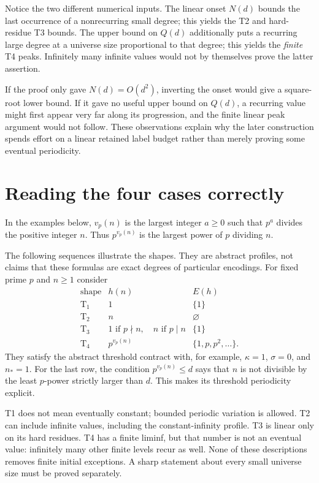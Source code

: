 Notice the two different numerical inputs. The linear onset $N(d)$
bounds the last occurrence of a nonrecurring small degree; this yields
the T2 and hard-residue T3 bounds. The upper bound on $Q(d)$ additionally
puts a recurring large degree at a universe size proportional to that degree;
this yields the \emph{finite} T4 peaks. Infinitely many infinite values
would not by themselves prove the latter assertion.

If the proof only gave $N(d)=O(d^2)$, inverting the onset would give a
square-root lower bound. If it gave no useful upper bound on $Q(d)$,
a recurring value might first appear very far along its progression,
and the finite linear peak argument would not follow. These observations
explain why the later construction spends effort on a linear retained
label budget rather than merely proving some eventual periodicity.

\section{Reading the four cases correctly}
In the examples below, $v_p(n)$ is the largest integer $a\ge0$ such
that $p^a$ divides the positive integer $n$. Thus $p^{v_p(n)}$ is the
largest power of $p$ dividing $n$.

The following sequences illustrate the shapes. They are abstract
profiles, not claims that these formulas are exact degrees of particular
encodings. For fixed prime $p$ and $n\ge1$ consider
\[
 \begin{array}{c|c|c}
 \text{shape}&h(n)&E(h)\\\hline
 \mathrm T_1&1&\{1\}\\
 \mathrm T_2&n&\varnothing\\
 \mathrm T_3&1\text{ if }p\nmid n,\quad n\text{ if }p\mid n&\{1\}\\
 \mathrm T_4&p^{v_p(n)}&\{1,p,p^2,\ldots\}.
 \end{array}
\]
They satisfy the abstract threshold contract with, for example,
$\kappa=1$, $\sigma=0$, and $n_*=1$. For the last row, the condition
$p^{v_p(n)}\le d$ says that $n$ is not divisible by the least $p$-power
strictly larger than $d$. This makes its threshold periodicity explicit.

T1 does not mean eventually constant; bounded periodic variation is
allowed. T2 can include infinite values, including the constant-infinity
profile. T3 is linear only on its hard residues. T4 has a finite liminf,
but that number is not an eventual value: infinitely many other finite
levels recur as well. None of these descriptions removes finite initial
exceptions. A sharp statement about every small universe size must be proved
separately.

